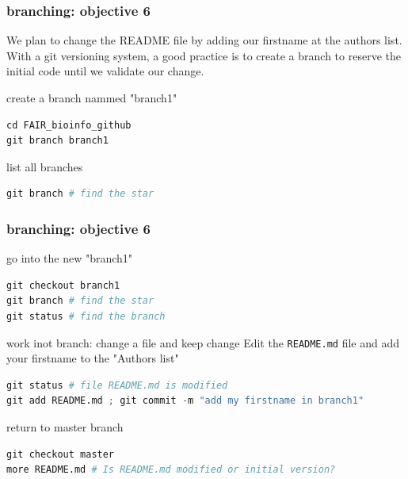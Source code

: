 \begin{frame}[containsverbatim]
\frametitle{ branching: objective 6}
\begin{exampleblock}{}
We plan to change the README file by adding our firstname at the authors list. With a git versioning system, a good practice is to create a branch to reserve the initial code until we validate our change.
\end{exampleblock}
\begin{exampleblock}{create a branch nammed "branch1"}
\begin{lstlisting}[language=python]
cd FAIR_bioinfo_github
git branch branch1
\end{lstlisting}
\end{exampleblock}
\begin{exampleblock}{list all branches}
\begin{lstlisting}[language=python]
git branch # find the star
\end{lstlisting}
\end{exampleblock}
\end{frame}
\begin{frame}[containsverbatim]
\frametitle{ branching: objective 6}
\begin{exampleblock}{go into the new "branch1"}
\begin{lstlisting}[language=python]
git checkout branch1
git branch # find the star
git status # find the branch
\end{lstlisting}
\end{exampleblock}
\begin{exampleblock}{work inot branch: change a file and keep change}
Edit the \verb|README.md| file and add your firstname to the "Authors list"
\begin{lstlisting}[language=python]
git status # file README.md is modified
git add README.md ; git commit -m "add my firstname in branch1"
\end{lstlisting}
\end{exampleblock}
\begin{exampleblock}{return to master branch}
\begin{lstlisting}[language=python]
git checkout master
more README.md # Is README.md modified or initial version?
\end{lstlisting}
\end{exampleblock}
\end{frame}
